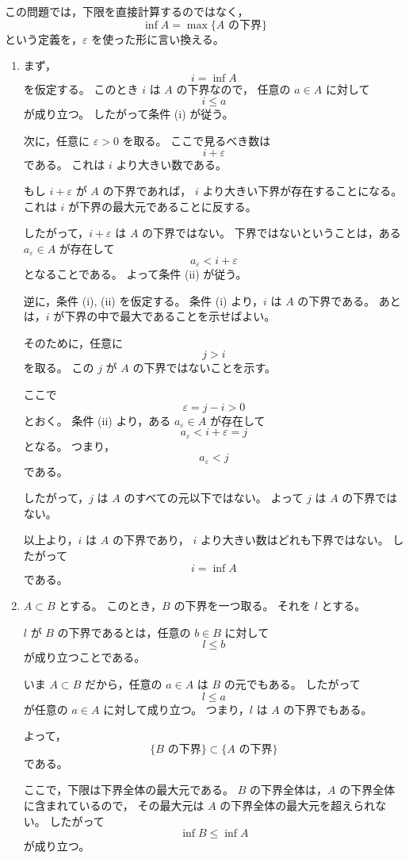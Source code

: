 \begin{strategy}
	この問題では，下限を直接計算するのではなく，
	\[
	\inf A=\max\{\text{\(A\) の下界}\}
	\]
	という定義を，\(\varepsilon\) を使った形に言い換える。
	
	\begin{enumerate}
		\item[(1)]
		まず，
		\[
		i=\inf A
		\]
		を仮定する。
		このとき \(i\) は \(A\) の下界なので，
		任意の \(a\in A\) に対して
		\[
		i\leq a
		\]
		が成り立つ。
		したがって条件 (i) が従う。
		
		次に，任意に \(\varepsilon>0\) を取る。
		ここで見るべき数は
		\[
		i+\varepsilon
		\]
		である。
		これは \(i\) より大きい数である。
		
		もし \(i+\varepsilon\) が \(A\) の下界であれば，
		\(i\) より大きい下界が存在することになる。
		これは \(i\) が下界の最大元であることに反する。
		
		したがって，\(i+\varepsilon\) は \(A\) の下界ではない。
		下界ではないということは，ある \(a_\varepsilon\in A\) が存在して
		\[
		a_\varepsilon<i+\varepsilon
		\]
		となることである。
		よって条件 (ii) が従う。
		
		逆に，条件 (i), (ii) を仮定する。
		条件 (i) より，\(i\) は \(A\) の下界である。
		あとは，\(i\) が下界の中で最大であることを示せばよい。
		
		そのために，任意に
		\[
		j>i
		\]
		を取る。
		この \(j\) が \(A\) の下界ではないことを示す。
		
		ここで
		\[
		\varepsilon=j-i>0
		\]
		とおく。
		条件 (ii) より，ある \(a_\varepsilon\in A\) が存在して
		\[
		a_\varepsilon<i+\varepsilon=j
		\]
		となる。
		つまり，
		\[
		a_\varepsilon<j
		\]
		である。
		
		したがって，\(j\) は \(A\) のすべての元以下ではない。
		よって \(j\) は \(A\) の下界ではない。
		
		以上より，\(i\) は \(A\) の下界であり，
		\(i\) より大きい数はどれも下界ではない。
		したがって
		\[
		i=\inf A
		\]
		である。
		
		\item[(2)]
		\(A\subset B\) とする。
		このとき，\(B\) の下界を一つ取る。
		それを \(l\) とする。
		
		\(l\) が \(B\) の下界であるとは，任意の \(b\in B\) に対して
		\[
		l\leq b
		\]
		が成り立つことである。
		
		いま \(A\subset B\) だから，任意の \(a\in A\) は \(B\) の元でもある。
		したがって
		\[
		l\leq a
		\]
		が任意の \(a\in A\) に対して成り立つ。
		つまり，\(l\) は \(A\) の下界でもある。
		
		よって，
		\[
		\{\text{\(B\) の下界}\}
		\subset
		\{\text{\(A\) の下界}\}
		\]
		である。
		
		ここで，下限は下界全体の最大元である。
		\(B\) の下界全体は，\(A\) の下界全体に含まれているので，
		その最大元は \(A\) の下界全体の最大元を超えられない。
		したがって
		\[
		\inf B\leq \inf A
		\]
		が成り立つ。
	\end{enumerate}
\end{strategy}